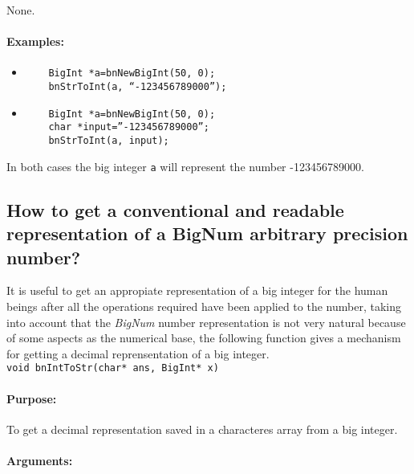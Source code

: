 \documentclass{book}
\begin{document}
None.

\paragraph{Examples:}

\begin{itemize}
\item

\begin{verbatim}
	BigInt *a=bnNewBigInt(50, 0);
	bnStrToInt(a, “-123456789000”);
\end{verbatim}

\item

\begin{verbatim}
	BigInt *a=bnNewBigInt(50, 0);
	char *input=”-123456789000”;
	bnStrToInt(a, input);
\end{verbatim}
\end{itemize}

In both cases the big integer \verb+a+ will represent the number -123456789000.

\subsection{How to get a conventional and readable representation of a BigNum arbitrary precision number?}

It is useful to get an appropiate representation of a big integer for the human beings after all the operations required have been applied to the number, taking into account that the \emph{BigNum} number representation is not very natural because of some aspects as the numerical base, the following function gives a mechanism for getting a decimal reprensentation of a big integer.\\

\verb+void bnIntToStr(char* ans, BigInt* x)+\\

\paragraph{Purpose:} 

To get a decimal representation saved in a characteres array from a big integer.

\paragraph{Arguments:}
\end{document}
